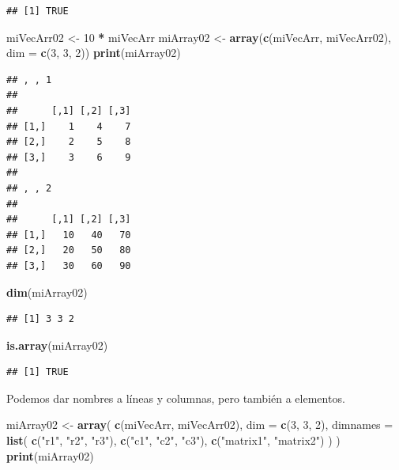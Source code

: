 \documentclass[
]{book}
\newenvironment{Shaded}{\begin{snugshade}}{\end{snugshade}}
\newcommand{\DataTypeTok}[1]{\textcolor[rgb]{0.13,0.29,0.53}{#1}}
\newcommand{\DecValTok}[1]{\textcolor[rgb]{0.00,0.00,0.81}{#1}}
\newcommand{\KeywordTok}[1]{\textcolor[rgb]{0.13,0.29,0.53}{\textbf{#1}}}
\newcommand{\NormalTok}[1]{#1}
\newcommand{\OperatorTok}[1]{\textcolor[rgb]{0.81,0.36,0.00}{\textbf{#1}}}
\newcommand{\StringTok}[1]{\textcolor[rgb]{0.31,0.60,0.02}{#1}}
\begin{document}
\begin{verbatim}
## [1] TRUE
\end{verbatim}

\begin{Shaded}
\begin{Highlighting}[]
\NormalTok{miVecArr02 <-}\StringTok{ }\DecValTok{10} \OperatorTok{*}\StringTok{ }\NormalTok{miVecArr}
\NormalTok{miArray02 <-}\StringTok{ }\KeywordTok{array}\NormalTok{(}\KeywordTok{c}\NormalTok{(miVecArr, miVecArr02), }\DataTypeTok{dim =} \KeywordTok{c}\NormalTok{(}\DecValTok{3}\NormalTok{, }\DecValTok{3}\NormalTok{, }\DecValTok{2}\NormalTok{))}
\KeywordTok{print}\NormalTok{(miArray02)}
\end{Highlighting}
\end{Shaded}

\begin{verbatim}
## , , 1
## 
##      [,1] [,2] [,3]
## [1,]    1    4    7
## [2,]    2    5    8
## [3,]    3    6    9
## 
## , , 2
## 
##      [,1] [,2] [,3]
## [1,]   10   40   70
## [2,]   20   50   80
## [3,]   30   60   90
\end{verbatim}

\begin{Shaded}
\begin{Highlighting}[]
\KeywordTok{dim}\NormalTok{(miArray02)}
\end{Highlighting}
\end{Shaded}

\begin{verbatim}
## [1] 3 3 2
\end{verbatim}

\begin{Shaded}
\begin{Highlighting}[]
\KeywordTok{is.array}\NormalTok{(miArray02)}
\end{Highlighting}
\end{Shaded}

\begin{verbatim}
## [1] TRUE
\end{verbatim}

Podemos dar nombres a líneas y columnas, pero también a elementos.

\begin{Shaded}
\begin{Highlighting}[]
\NormalTok{miArray02 <-}\StringTok{ }\KeywordTok{array}\NormalTok{(}
  \KeywordTok{c}\NormalTok{(miVecArr, miVecArr02), }
  \DataTypeTok{dim =} \KeywordTok{c}\NormalTok{(}\DecValTok{3}\NormalTok{, }\DecValTok{3}\NormalTok{, }\DecValTok{2}\NormalTok{), }
  \DataTypeTok{dimnames =} \KeywordTok{list}\NormalTok{(}
    \KeywordTok{c}\NormalTok{(}\StringTok{"r1"}\NormalTok{, }\StringTok{"r2"}\NormalTok{, }\StringTok{"r3"}\NormalTok{), }
    \KeywordTok{c}\NormalTok{(}\StringTok{"c1"}\NormalTok{, }\StringTok{"c2"}\NormalTok{, }\StringTok{"c3"}\NormalTok{), }
    \KeywordTok{c}\NormalTok{(}\StringTok{"matrix1"}\NormalTok{, }\StringTok{"matrix2"}\NormalTok{)}
\NormalTok{  )}
\NormalTok{)}
\KeywordTok{print}\NormalTok{(miArray02)}
\end{Highlighting}
\end{Shaded}
\end{document}

